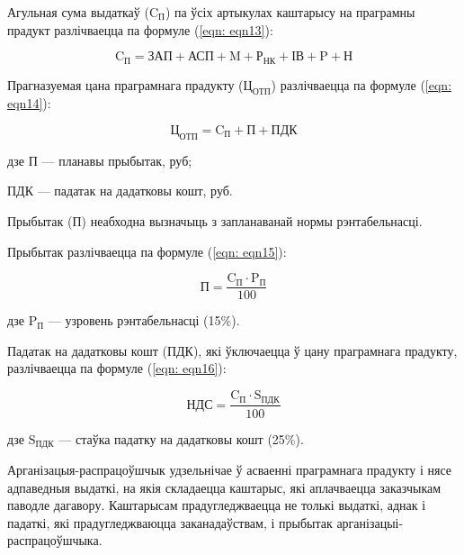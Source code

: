 Агульная сума выдаткаў ($\text{C}_\text{П}$) па ўсіх артыкулах каштарысу на праграмны прадукт разлічваецца па формуле (\ref{eqn: eqn13}):

\begin{equation}
    \label{eqn: eqn13}
    \text{C}_\text{П} = \text{ЗАП} + \text{АСП} + \text{M}
    + \text{Р}_\text{НК} + \text{ІВ} + \text{P}+\text{Н}
\end{equation}

Прагназуемая цана праграмнага прадукту ($\text{Ц}_\text{ОТП}$) разлічваецца па формуле (\ref{eqn: eqn14}):

\begin{equation}
    \label{eqn: eqn14}
    \text{Ц}_\text{ОТП} = \text{C}_\text{П} + \text{П} + \text{ПДК}
\end{equation}
\begin{Explanation}
    \item[дзе] $\text{П}$ --- планавы прыбытак, руб;
    \item ПДК --- падатак на дадатковы кошт, руб.
\end{Explanation}

Прыбытак (П) неабходна вызначыць з запланаванай нормы рэнтабельнасці.

Прыбытак разлічваецца па формуле (\ref{eqn: eqn15}):

\begin{equation}
    \label{eqn: eqn15}
    \text{П} = \frac{\text{C}_\text{П} \cdot \text{P}_\text{П}}{100}
\end{equation}
\begin{Explanation}
    \item[дзе] $\text{P}_\text{П}$ --- узровень рэнтабельнасці (15\%).
\end{Explanation}

Падатак на дадатковы кошт (ПДК), які ўключаецца ў цану праграмнага прадукту, разлічваецца па формуле (\ref{eqn: eqn16}):

\begin{equation}
    \label{eqn: eqn16}
    \text{НДС} = \frac{\text{C}_\text{П} \cdot \text{S}_\text{ПДК}}{100}
\end{equation}
\begin{Explanation}
    \item[дзе] $\text{S}_\text{ПДК}$ --- стаўка падатку на дадатковы кошт (25\%).
\end{Explanation}

Арганізацыя-распрацоўшчык удзельнічае ў асваенні праграмнага прадукту і нясе адпаведныя выдаткі, на якія складаецца каштарыс, які аплачваецца заказчыкам паводле дагавору. Каштарысам прадугледжваецца не толькі выдаткі, аднак і падаткі, які прадугледжваюцца заканадаўствам, і прыбытак арганізацыі-распрацоўшчыка.

